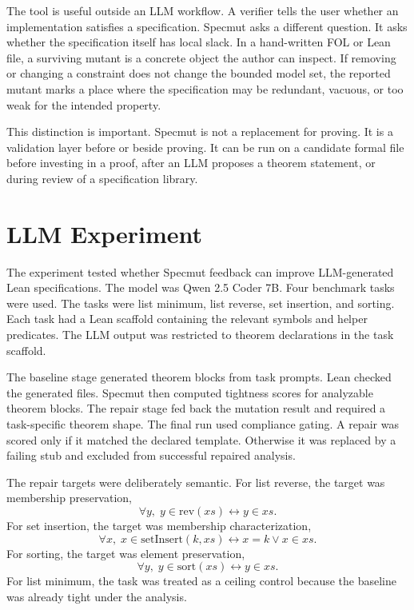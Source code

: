 \documentclass[11pt]{article}
\begin{document}
The tool is useful outside an LLM workflow. A verifier tells the user whether an implementation satisfies a specification. Specmut asks a different question. It asks whether the specification itself has local slack. In a hand-written FOL or Lean file, a surviving mutant is a concrete object the author can inspect. If removing or changing a constraint does not change the bounded model set, the reported mutant marks a place where the specification may be redundant, vacuous, or too weak for the intended property.

This distinction is important. Specmut is not a replacement for proving. It is a validation layer before or beside proving. It can be run on a candidate formal file before investing in a proof, after an LLM proposes a theorem statement, or during review of a specification library.

\section{LLM Experiment}

The experiment tested whether Specmut feedback can improve LLM-generated Lean specifications. The model was Qwen 2.5 Coder 7B. Four benchmark tasks were used. The tasks were list minimum, list reverse, set insertion, and sorting. Each task had a Lean scaffold containing the relevant symbols and helper predicates. The LLM output was restricted to theorem declarations in the task scaffold.

The baseline stage generated theorem blocks from task prompts. Lean checked the generated files. Specmut then computed tightness scores for analyzable theorem blocks. The repair stage fed back the mutation result and required a task-specific theorem shape. The final run used compliance gating. A repair was scored only if it matched the declared template. Otherwise it was replaced by a failing stub and excluded from successful repaired analysis.

The repair targets were deliberately semantic. For list reverse, the target was membership preservation,
\[
\forall y,\; y\in \mathrm{rev}(xs)\leftrightarrow y\in xs.
\]
For set insertion, the target was membership characterization,
\[
\forall x,\; x\in\mathrm{setInsert}(k,xs)\leftrightarrow x=k\lor x\in xs.
\]
For sorting, the target was element preservation,
\[
\forall y,\; y\in\mathrm{sort}(xs)\leftrightarrow y\in xs.
\]
For list minimum, the task was treated as a ceiling control because the baseline was already tight under the analysis.
\end{document}
